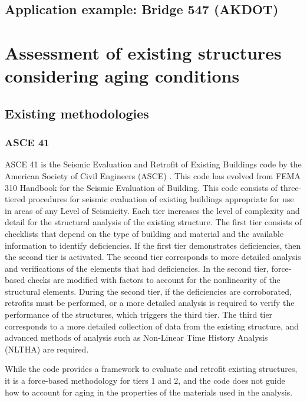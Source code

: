 \subsection{Application example: Bridge 547 (AKDOT)}

\section{Assessment of existing structures considering aging conditions}

\subsection{Existing methodologies}

\subsubsection{ASCE 41}

ASCE 41 is the Seismic Evaluation and Retrofit of Existing Buildings code by the American Society of Civil Engineers (ASCE) \cite{ASCE-41-2017}. This code has evolved from FEMA 310 Handbook for the Seismic Evaluation of Building. This code consists of three-tiered procedures for seismic evaluation of existing buildings appropriate for use in areas of any Level of Seismicity. Each tier increases the level of complexity and detail for the structural analysis of the existing structure. The first tier consists of checklists that depend on the type of building and material and the available information to identify deficiencies. If the first tier demonstrates deficiencies, then the second tier is activated. The second tier corresponds to more detailed analysis and verifications of the elements that had deficiencies. In the second tier, force-based checks are modified with factors to account for the nonlinearity of the structural elements. During the second tier, if the deficiencies are corroborated, retrofits must be performed, or a more detailed analysis is required to verify the performance of the structures, which triggers the third tier. The third tier corresponds to a more detailed collection of data from the existing structure, and advanced methods of analysis such as Non-Linear Time History Analysis (NLTHA) are required.

While the code provides a framework to evaluate and retrofit existing structures, it is a force-based methodology for tiers 1 and 2, and the code does not guide how to account for aging in the properties of the materials used in the analysis. 

